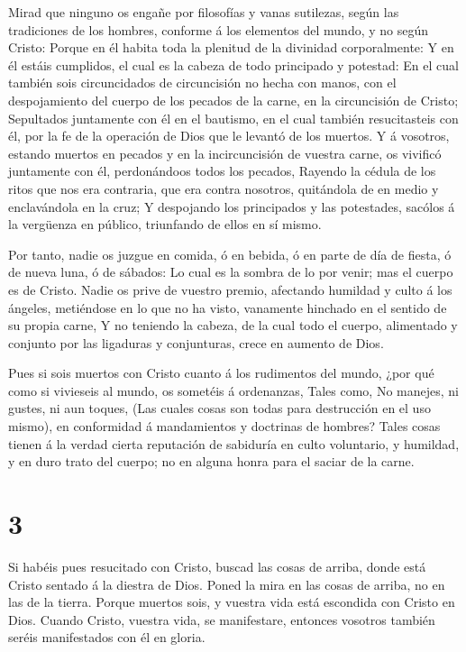  Mirad que ninguno os engañe por filosofías y vanas
sutilezas, según las tradiciones de los hombres, conforme á los
elementos del mundo, y no según Cristo:  Porque en él habita
toda la plenitud de la divinidad corporalmente:  Y en él
estáis cumplidos, el cual es la cabeza de todo principado y potestad:
 En el cual también sois circuncidados de circuncisión no
hecha con manos, con el despojamiento del cuerpo de los pecados de la
carne, en la circuncisión de Cristo;  Sepultados juntamente
con él en el bautismo, en el cual también resucitasteis con él, por la
fe de la operación de Dios que le levantó de los muertos. 
Y á vosotros, estando muertos en pecados y en la incircuncisión de
vuestra carne, os vivificó juntamente con él, perdonándoos todos los
pecados,  Rayendo la cédula de los ritos que nos era
contraria, que era contra nosotros, quitándola de en medio y
enclavándola en la cruz;  Y despojando los principados y
las potestades, sacólos á la vergüenza en público, triunfando de ellos
en sí mismo.

 Por tanto, nadie os juzgue en comida, ó en bebida, ó en
parte de día de fiesta, ó de nueva luna, ó de sábados:  Lo
cual es la sombra de lo por venir; mas el cuerpo es de Cristo.
 Nadie os prive de vuestro premio, afectando humildad y
culto á los ángeles, metiéndose en lo que no ha visto, vanamente
hinchado en el sentido de su propia carne,  Y no teniendo
la cabeza, de la cual todo el cuerpo, alimentado y conjunto por las
ligaduras y conjunturas, crece en aumento de Dios.

 Pues si sois muertos con Cristo cuanto á los rudimentos
del mundo, ¿por qué como si vivieseis al mundo, os sometéis á
ordenanzas,  Tales como, No manejes, ni gustes, ni aun
toques,  (Las cuales cosas son todas para destrucción en el
uso mismo), en conformidad á mandamientos y doctrinas de hombres?
 Tales cosas tienen á la verdad cierta reputación de
sabiduría en culto voluntario, y humildad, y en duro trato del cuerpo;
no en alguna honra para el saciar de la carne.

\hypertarget{section-2}{%
\section{3}\label{section-2}}

 Si habéis pues resucitado con Cristo, buscad las cosas de
arriba, donde está Cristo sentado á la diestra de Dios. 
Poned la mira en las cosas de arriba, no en las de la tierra.
 Porque muertos sois, y vuestra vida está escondida con
Cristo en Dios.  Cuando Cristo, vuestra vida, se
manifestare, entonces vosotros también seréis manifestados con él en
gloria.

